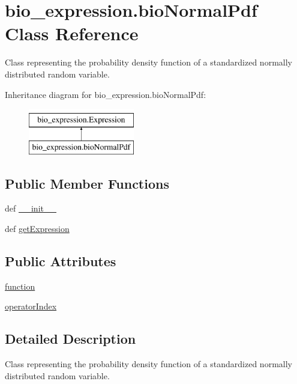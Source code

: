 \hypertarget{classbio__expression_1_1bio_normal_pdf}{\section{bio\+\_\+expression.\+bio\+Normal\+Pdf Class Reference}
\label{classbio__expression_1_1bio_normal_pdf}
}


Class representing the probability density function of a standardized normally distributed random variable.  


Inheritance diagram for bio\+\_\+expression.\+bio\+Normal\+Pdf\+:\begin{figure}[H]
\begin{center}
\leavevmode
\includegraphics[height=2.000000cm]{d4/df8/classbio__expression_1_1bio_normal_pdf}
\end{center}
\end{figure}
\subsection*{Public Member Functions}
\begin{DoxyCompactItemize}
\item 
def \hyperlink{classbio__expression_1_1bio_normal_pdf_a7abe9d9e7a408dad8e8c22c044500371}{\+\_\+\+\_\+init\+\_\+\+\_\+}
\item 
def \hyperlink{classbio__expression_1_1bio_normal_pdf_abf918e4335d35391b77f1fb991518f60}{get\+Expression}
\end{DoxyCompactItemize}
\subsection*{Public Attributes}
\begin{DoxyCompactItemize}
\item 
\hyperlink{classbio__expression_1_1bio_normal_pdf_ad59a9659d06a48d7d4a44037f56882c0}{function}
\item 
\hyperlink{classbio__expression_1_1bio_normal_pdf_a1129591234db4f63d55b09674e027fa7}{operator\+Index}
\end{DoxyCompactItemize}


\subsection{Detailed Description}
Class representing the probability density function of a standardized normally distributed random variable. 

